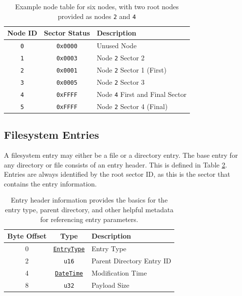 \documentclass{article}
\begin{document}
\begin{table}[h!]
    \centering
    \begin{tabular}{c|c|l}
        \hline
        Node ID & Sector Status & Description \\
        \hline
        \texttt{0} & \texttt{0x0000} & Unused Node \\
        \texttt{1} & \texttt{0x0003} & Node \texttt{2} Sector 2 \\
        \texttt{2} & \texttt{0x0001} & Node \texttt{2} Sector 1 (First) \\
        \texttt{3} & \texttt{0x0005} & Node \texttt{2} Sector 3 \\
        \texttt{4} & \texttt{0xFFFF} & Node \texttt{4} First and Final Sector \\
        \texttt{5} & \texttt{0xFFFF} & Node \texttt{2} Sector 4 (Final) \\
        \hline
    \end{tabular}
    \caption{Example node table for six nodes, with two root nodes provided as nodes \texttt{2} and \texttt{4}}
    \label{table:node-table-example}
\end{table}

\subsection{Filesystem Entries}

A filesystem entry may either be a file or a directory entry. The base entry for any directory or file consists of an entry header. This is defined in Table \ref{table:cbfs-entry-header}. Entries are always identified by the root sector ID, as this is the sector that contains the entry information.

\begin{table}[h!]
    \centering
    \begin{tabular}{cc|l}
        \hline
        Byte Offset & Type & Description \\
        \hline
        0 & \hyperref[sec:type-entrytype]{\texttt{EntryType}} & Entry Type \\
        2 & \texttt{u16} & Parent Directory Entry ID \\
        4 & \hyperref[sec:type-datetime]{\texttt{DateTime}} & Modification Time \\
        8 & \texttt{u32} & Payload Size \\
        \hline
    \end{tabular}
    \caption{Entry header information provides the basics for the entry type, parent directory, and other helpful metadata for referencing entry parameters.}
    \label{table:cbfs-entry-header}
\end{table}
\end{document}
